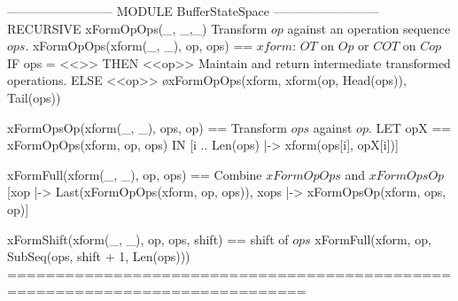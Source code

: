 \documentclass{article}
\begin{document}
\begin{tla}
-------------------------- MODULE BufferStateSpace --------------------------
RECURSIVE xFormOpOps(_, _,_) \* Transform $op$ against an operation sequence $ops$. 
xFormOpOps(xform(_, _), op, ops) == \* $xform$: $OT$ on $Op$ or $COT$ on $Cop$
    IF ops = <<>> THEN <<op>> \* Maintain and return intermediate transformed operations.
    ELSE <<op>> \o xFormOpOps(xform, xform(op, Head(ops)), Tail(ops))

xFormOpsOp(xform(_, _), ops, op) == \* Transform $ops$ against $op$.
    LET opX == xFormOpOps(xform, op, ops)
    IN  [i  .. Len(ops) |-> xform(ops[i], opX[i])]

xFormFull(xform(_, _), op, ops) == \* Combine $xFormOpOps$ and $xFormOpsOp$
    [xop |-> Last(xFormOpOps(xform, op, ops)),
    xops |-> xFormOpsOp(xform, ops, op)]

xFormShift(xform(_, _), op, ops, shift) == \* shift of $ops$
    xFormFull(xform, op, SubSeq(ops, shift + 1, Len(ops)))
=============================================================================
\end{tla}
\end{document}
